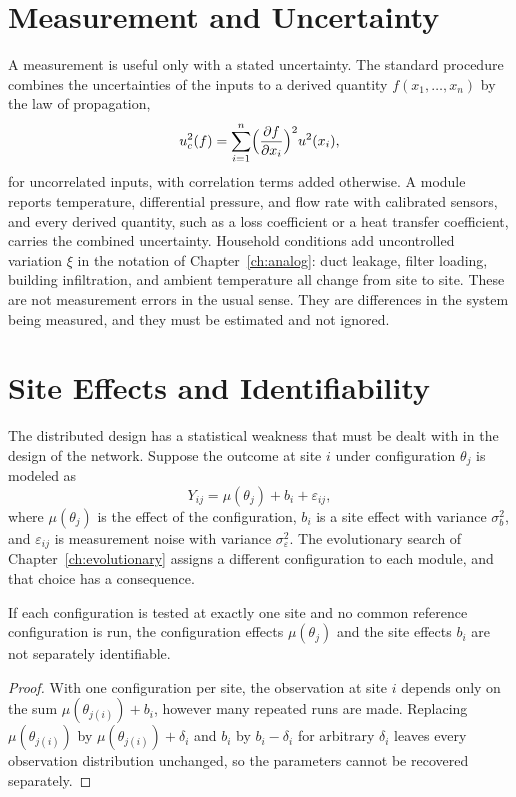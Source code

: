 \section{Measurement and Uncertainty}

A measurement is useful only with a stated uncertainty. The standard procedure~\cite{jcgm2008} combines the uncertainties of the inputs to a derived quantity $f(x_1,\dots,x_n)$ by the law of propagation,
\[
u_c^{2}(f)=\sum_{i=1}^{n}\Bigl(\frac{\partial f}{\partial x_i}\Bigr)^{2}u^{2}(x_i),
\]
for uncorrelated inputs, with correlation terms added otherwise. A module reports temperature, differential pressure, and flow rate with calibrated sensors, and every derived quantity, such as a loss coefficient or a heat transfer coefficient, carries the combined uncertainty. Household conditions add uncontrolled variation $\xi$ in the notation of Chapter~\ref{ch:analog}: duct leakage, filter loading, building infiltration, and ambient temperature all change from site to site. These are not measurement errors in the usual sense. They are differences in the system being measured, and they must be estimated and not ignored.

\section{Site Effects and Identifiability}

The distributed design has a statistical weakness that must be dealt with in the design of the network. Suppose the outcome at site $i$ under configuration $\theta_j$ is modeled as
\[
Y_{ij}=\mu(\theta_j)+b_i+\varepsilon_{ij},
\]
where $\mu(\theta_j)$ is the effect of the configuration, $b_i$ is a site effect with variance $\sigma_b^{2}$, and $\varepsilon_{ij}$ is measurement noise with variance $\sigma_\varepsilon^{2}$. The evolutionary search of Chapter~\ref{ch:evolutionary} assigns a different configuration to each module, and that choice has a consequence.

\begin{proposition}
\label{prop:identifiability}
If each configuration is tested at exactly one site and no common reference configuration is run, the configuration effects $\mu(\theta_j)$ and the site effects $b_i$ are not separately identifiable.
\end{proposition}

\begin{proof}
With one configuration per site, the observation at site $i$ depends only on the sum $\mu(\theta_{j(i)})+b_i$, however many repeated runs are made. Replacing $\mu(\theta_{j(i)})$ by $\mu(\theta_{j(i)})+\delta_i$ and $b_i$ by $b_i-\delta_i$ for arbitrary $\delta_i$ leaves every observation distribution unchanged, so the parameters cannot be recovered separately.
\end{proof}

